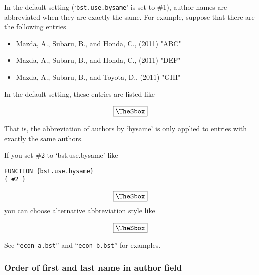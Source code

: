 \documentclass[10pt]{article}
\newenvironment{Frame}%
{\setlength{\fboxsep}{15pt}
\setlength{\mylength}{\linewidth}%
\addtolength{\mylength}{-2\fboxsep}%
\addtolength{\mylength}{-2\fboxrule}%
\Sbox
\minipage{\mylength}%
\setlength{\abovedisplayskip}{0pt}%
\setlength{\belowdisplayskip}{0pt}%
}%
{\endminipage\endSbox
\[\fbox{\TheSbox}\]}
\newcommand{\bysameline}{\hskip.3em \leavevmode\rule[.5ex]{3em}{.3pt}\hskip0.5em}
\begin{document}
In the default setting (`\texttt{bst.use.bysame}' is set to \#1), author names
are abbreviated when they are exactly the same. For example, suppose that there
are the following entries
\begin{itemize}
 \item Mazda, A., Subaru, B., and Honda, C., (2011) "ABC"
 \item Mazda, A., Subaru, B., and Honda, C., (2011) "DEF"
 \item Mazda, A., Subaru, B., and Toyota, D., (2011) "GHI"
\end{itemize}
\vspace*{1em}

In the default setting, these entries are listed like
\begin{Frame}
\end{Frame}

That is, the abbreviation of authors by `bysame' is only applied to
entries with exactly the same authors.

If you set \#2 to `bst.use.bysame' like
\begin{Frame}
\begin{verbatim}
FUNCTION {bst.use.bysame}
{ #2 }  
\end{verbatim}
\end{Frame}
you can choose alternative abbreviation style like
\begin{Frame}
\end{Frame}
\vspace*{1em}

See ``\texttt{econ-a.bst}'' and ``\texttt{econ-b.bst}'' for examples.


\subsubsection{Order of first and last name in author field}
\end{document}
